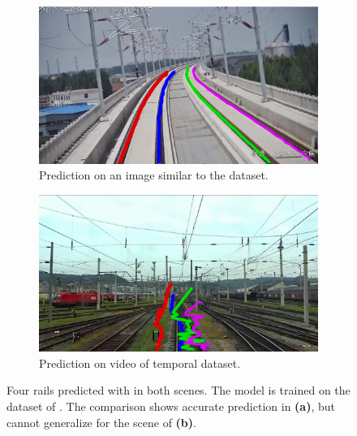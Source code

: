 \begin{figure}[H]
    \centering
    \begin{subfigure}{0.49\textwidth}
        \centering
        \includegraphics[width=\linewidth]{PICs/discussion/multirail_example.jpg}
        \caption{Prediction on an image similar to the dataset.}
        \label{fig:mutlirailTest_a}
    \end{subfigure}
    \hfill
    \begin{subfigure}{0.49\textwidth}
        \centering
        \includegraphics[width=\linewidth]{PICs/discussion/multirail.jpg}
        \caption{Prediction on video of temporal dataset.}
        \label{fig:mutlirailTest_b}
    \end{subfigure}
    \caption{Four rails predicted with \cite{li2022rail} in both scenes. The model is trained on the dataset of \cite{li2022rail}. The comparison shows accurate prediction in \textbf{(a)}, but cannot generalize for the scene of \textbf{(b)}.}
    \label{fig:mutlirailTest}
\end{figure}

